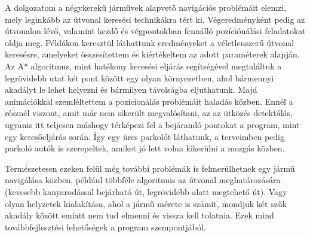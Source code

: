 
A dolgozatom a négykerekű járművek alapvető navigációs problémáit elemzi, mely leginkább az útvonal keresési technikákra tért ki. Végeredményként pedig az útvonalon lévő, valamint kezdő és végpontokban fennálló pozíciónálási feladatokat oldja meg. Példákon keresztül láthattunk eredményeket a véletlenszerű útvonal keresésre, amelyeket összesítettem és kiértékeltem az adott paraméterek alapján. Az A* algoritmus, mint hatékony keresési eljárás segítségével megtaláltuk a legrövidebb utat két pont között egy olyan környezetben, ahol bármennyi akadályt le lehet helyezni és bármilyen távolságba eljuthatunk. Majd animációkkal szemléltettem a pozícionálás problémáit haladás közben. Ennél a résznél viszont, amit már nem sikerült megvalósítani, az az ütközés detektálás, ugyanis itt teljesen máshogy térképezi fel a bejárandó pontokat a program, mint egy keresőeljárás során. Így egy üres parkolót láthatunk, a terveimben pedig parkoló autók is szerepeltek, amiket jó lett volna kikerülni a mozgás közben.

Természetesen ezeken felül még további problémák is felmerülhetnek egy jármű navigálása közben, például többféle algoritmus az útvonal meghatározására (kevesebb kanyarodással bejárható út, legrövidebb alatt megtehető út). Vagy olyan helyzetek kialakítása, ahol a jármű mérete is számít, mondjuk két szűk akadály között emiatt nem tud elmenni és vissza kell tolatnia. Ezek mind továbbfejlesztési lehetőségek a program szempontjából.